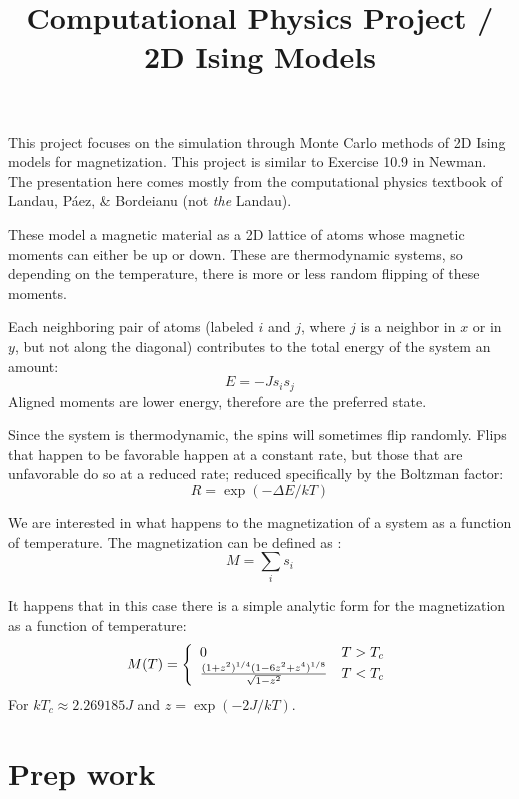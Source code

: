 \documentclass[11pt, preprint]{aastex}
\begin{document}
\title{\bf Computational Physics Project / 2D Ising Models}

This project focuses on the simulation through Monte Carlo methods of
2D Ising models for magnetization. This project is similar to Exercise
10.9 in Newman.  The presentation here comes mostly from the
computational physics textbook of Landau, P{\'a}ez, \& Bordeianu
(not {\it the} Landau).

These model a magnetic material as a 2D lattice of atoms whose
magnetic moments can either be up or down. These are thermodynamic
systems, so depending on the temperature, there is more or less random
flipping of these moments.

Each neighboring pair of atoms (labeled $i$ and $j$, where $j$ is a
neighbor in $x$ or in $y$, but not along the diagonal) contributes to
the total energy of the system an amount:
\begin{equation}
  E = - J s_{i} s_{j}
\end{equation}
Aligned moments are lower energy, therefore are the preferred state.

Since the system is thermodynamic, the spins will sometimes flip
randomly. Flips that happen to be favorable happen at a constant rate,
but those that are unfavorable do so at a reduced rate; reduced
specifically by the Boltzman factor:
\begin{equation}
  R = \exp\left(-\Delta E /k T\right)
\end{equation}

We are interested in what happens to the magnetization of a system as
a function of temperature.  The magnetization can be defined as :
\begin{equation}
M = \sum_i s_i
\end{equation}

It happens that in this case there is a simple analytic form for the
magnetization as a function of temperature:
\begin{equation}
  M(T) = \left\{
  \begin{array}{ll}
  0 & T > T_c \cr
  \frac{(1+z^2)^{1/4} (1-6 z^2 +z^4)^{1/8}}{\sqrt{1-z^2}} & T < T_c
    \end{array}\right. 
\end{equation}
For $kT_c \approx 2.269185 J$ and $z=\exp(-2J/kT)$.

\section{Prep work}
\end{document}

